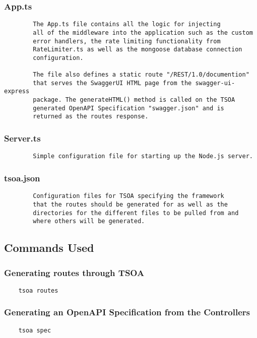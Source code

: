 \subsubsection{App.ts}
\begin{verbatim}
        The App.ts file contains all the logic for injecting
        all of the middleware into the application such as the custom
        error handlers, the rate limiting functionality from 
        RateLimiter.ts as well as the mongoose database connection 
        configuration.
        
        The file also defines a static route "/REST/1.0/documention"
        that serves the SwaggerUI HTML page from the swagger-ui-express
        package. The generateHTML() method is called on the TSOA
        generated OpenAPI Specification "swagger.json" and is
        returned as the routes response.
\end{verbatim}
\subsubsection{Server.ts}
\begin{verbatim}
        Simple configuration file for starting up the Node.js server.
\end{verbatim}
\subsubsection{tsoa.json}
\begin{verbatim}
        Configuration files for TSOA specifying the framework 
        that the routes should be generated for as well as the 
        directories for the different files to be pulled from and 
        where others will be generated.
\end{verbatim}
\subsection{Commands Used}
\subsubsection{Generating routes through TSOA}
\begin{verbatim}
    tsoa routes
\end{verbatim}
\subsubsection{Generating an OpenAPI Specification from the Controllers}
\begin{verbatim}
    tsoa spec
\end{verbatim}
